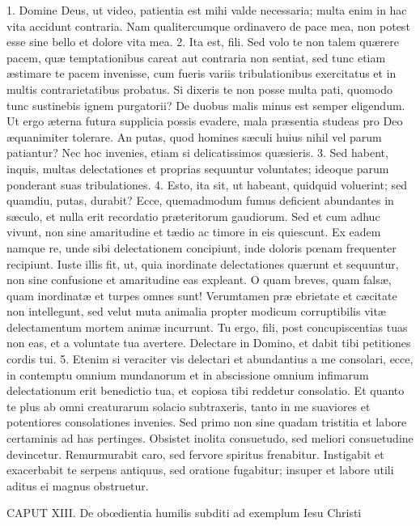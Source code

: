 1. Domine Deus, ut video, patientia est mihi valde necessaria; multa enim in hac vita accidunt contraria. Nam qualitercumque ordinavero de pace mea, non potest esse sine bello et dolore vita mea.
2. Ita est, fili. Sed volo te non talem quærere pacem, quæ temptationibus careat aut contraria non sentiat, sed tunc etiam æstimare te pacem invenisse, cum fueris variis tribulationibus exercitatus et in multis contrarietatibus probatus. Si dixeris te non posse multa pati, quomodo tunc sustinebis ignem purgatorii? De duobus malis minus est semper eligendum. Ut ergo æterna futura supplicia possis evadere, mala præsentia studeas pro Deo æquanimiter tolerare. An putas, quod homines sæculi huius nihil vel parum patiantur? Nec hoc invenies, etiam si delicatissimos quæsieris.
3. Sed habent, inquis, multas delectationes et proprias sequuntur voluntates; ideoque parum ponderant suas tribulationes.
4. Esto, ita sit, ut habeant, quidquid voluerint; sed quamdiu, putas, durabit? Ecce, quemadmodum fumus deficient abundantes in sæculo, et nulla erit recordatio præteritorum gaudiorum. Sed et cum adhuc vivunt, non sine amaritudine et tædio ac timore in eis quiescunt. Ex eadem namque re, unde sibi delectationem concipiunt, inde doloris pœnam frequenter recipiunt. Iuste illis fit, ut, quia inordinate delectationes quærunt et sequuntur, non sine confusione et amaritudine eas expleant. O quam breves, quam falsæ, quam inordinatæ et turpes omnes sunt! Verumtamen præ ebrietate et cæcitate non intellegunt, sed velut muta animalia propter modicum corruptibilis vitæ delectamentum mortem animæ incurrunt. Tu ergo, fili, post concupiscentias tuas non eas, et a voluntate tua avertere. Delectare in Domino, et dabit tibi petitiones cordis tui.
5. Etenim si veraciter vis delectari et abundantius a me consolari, ecce, in contemptu omnium mundanorum et in abscissione omnium infimarum delectationum erit benedictio tua, et copiosa tibi reddetur consolatio. Et quanto te plus ab omni creaturarum solacio subtraxeris, tanto in me suaviores et potentiores consolationes invenies. Sed primo non sine quadam tristitia et labore certaminis ad has pertinges. Obsistet inolita consuetudo, sed meliori consuetudine devincetur. Remurmurabit caro, sed fervore spiritus frenabitur. Instigabit et exacerbabit te serpens antiquus, sed oratione fugabitur; insuper et labore utili aditus ei magnus obstruetur.


CAPUT XIII.
De obœdientia humilis subditi ad exemplum Iesu Christi

